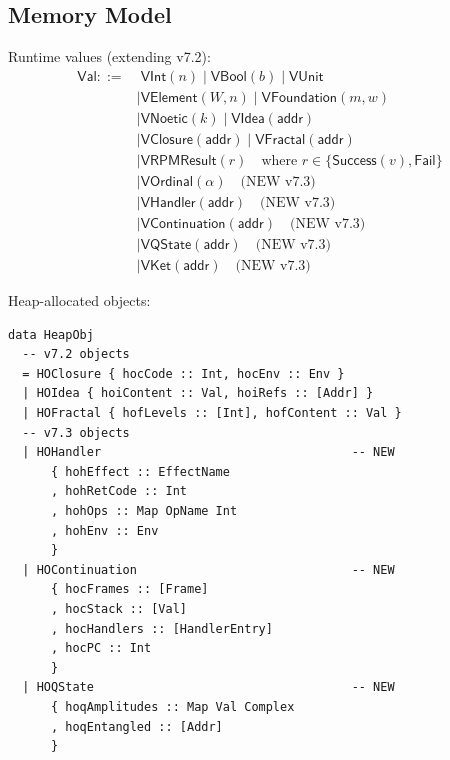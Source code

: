 \subsection{Memory Model}
\label{subsec:memory-model}

\begin{definition}[VM Values]
\label{def:vm-values-v73}
Runtime values (extending v7.2):
\begin{align}
\mathsf{Val} ::=&\; \mathsf{VInt}(n) \mid \mathsf{VBool}(b) \mid \mathsf{VUnit} \\
    &\mid \mathsf{VElement}(W, n) \mid \mathsf{VFoundation}(m, w) \\
    &\mid \mathsf{VNoetic}(k) \mid \mathsf{VIdea}(\mathsf{addr}) \\
    &\mid \mathsf{VClosure}(\mathsf{addr}) \mid \mathsf{VFractal}(\mathsf{addr}) \\
    &\mid \mathsf{VRPMResult}(r) \quad \text{where } r \in \{\mathsf{Success}(v), \mathsf{Fail}\} \\
    &\mid \mathsf{VOrdinal}(\alpha) \quad \text{(NEW v7.3)} \\
    &\mid \mathsf{VHandler}(\mathsf{addr}) \quad \text{(NEW v7.3)} \\
    &\mid \mathsf{VContinuation}(\mathsf{addr}) \quad \text{(NEW v7.3)} \\
    &\mid \mathsf{VQState}(\mathsf{addr}) \quad \text{(NEW v7.3)} \\
    &\mid \mathsf{VKet}(\mathsf{addr}) \quad \text{(NEW v7.3)}
\end{align}
\end{definition}

\begin{definition}
\label{def:heap-objects}
Heap-allocated objects:
\begin{verbatim}
data HeapObj
  -- v7.2 objects
  = HOClosure { hocCode :: Int, hocEnv :: Env }
  | HOIdea { hoiContent :: Val, hoiRefs :: [Addr] }
  | HOFractal { hofLevels :: [Int], hofContent :: Val }
  -- v7.3 objects
  | HOHandler                                   -- NEW
      { hohEffect :: EffectName
      , hohRetCode :: Int
      , hohOps :: Map OpName Int
      , hohEnv :: Env
      }
  | HOContinuation                              -- NEW
      { hocFrames :: [Frame]
      , hocStack :: [Val]
      , hocHandlers :: [HandlerEntry]
      , hocPC :: Int
      }
  | HOQState                                    -- NEW
      { hoqAmplitudes :: Map Val Complex
      , hoqEntangled :: [Addr]
      }
\end{verbatim}
\end{definition}

